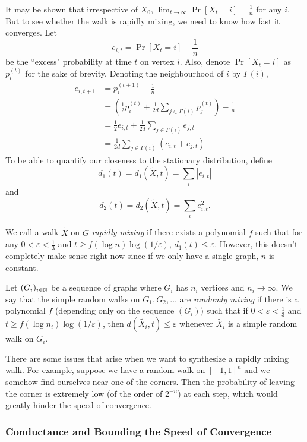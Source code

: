 It may be shown that irrespective of $X_0$, $\lim_{t\to\infty}\Pr[X_t=i] = \frac{1}{n}$ for any $i$. But to see whether the walk is rapidly mixing, we need to know how fast it converges. Let
\[ e_{i,t} = \Pr[X_t=i] - \frac{1}{n} \]
be the ``excess" probability at time $t$ on vertex $i$. Also, denote $\Pr[X_t=i]$ as $p_i^{(t)}$ for the sake of brevity. Denoting the neighbourhood of $i$ by $\Gamma(i)$,
\begin{align}
	e_{i,t+1} &= p_i^{(t+1)} - \frac{1}{n} \nonumber \\
	&= \left(\frac{1}{2}p_i^{(t)} + \frac{1}{2d}\sum_{j\in\Gamma(i)}p_j^{(t)}\right) - \frac{1}{n} \nonumber \\
	&= \frac{1}{2}e_{i,t} + \frac{1}{2d}\sum_{j\in\Gamma(i)}e_{j,t} \nonumber \\
	&= \frac{1}{2d} \sum_{j\in\Gamma(i)}(e_{i,t}+e_{j,t}) \label{eqn: alternate expression for future error}
\end{align}
To be able to quantify our closeness to the stationary distribution, define
\[d_1(t)=d_1(\tilde{X},t) = \sum_{i}|e_{i,t}|\]
and
\[d_2(t)=d_2(\tilde{X},t) = \sum_{i}e_{i,t}^2.\]

We call a walk $\tilde{X}$ on $G$ \textit{rapidly mixing} if there exists a polynomial $f$ such that for any $0<\varepsilon<\frac{1}{3}$ and $t\geq f(\log n)\log(1/\varepsilon)$, $d_1(t)\leq\varepsilon$. However, this doesn't completely make sense right now since if we only have a single graph, $n$ is constant.

\begin{fdef}
\label{def: rapidly mixing random walks}
	Let $(G_i)_{i\in\mathbb{N}}$ be a sequence of graphs where $G_i$ has $n_i$ vertices and $n_i\to\infty$. We say that the simple random walks on $G_1,G_2,\ldots$ are \textit{randomly mixing} if there is a polynomial $f$ (depending only on the sequence $(G_i)$) such that if $0<\varepsilon<\frac{1}{3}$ and $t\geq f(\log n_i)\log(1/\varepsilon)$, then $d(\tilde{X_i},t)\leq\varepsilon$ whenever $\tilde{X_i}$ is a simple random walk on $G_i$.
\end{fdef}

There are some issues that arise when we want to synthesize a rapidly mixing walk. For example, suppose we have a random walk on $[-1,1]^n$ and we somehow find ourselves near one of the corners. Then the probability of leaving the corner is extremely low (of the order of $2^{-n}$) at each step, which would greatly hinder the speed of convergence.

\subsubsection{Conductance and Bounding the Speed of Convergence}

